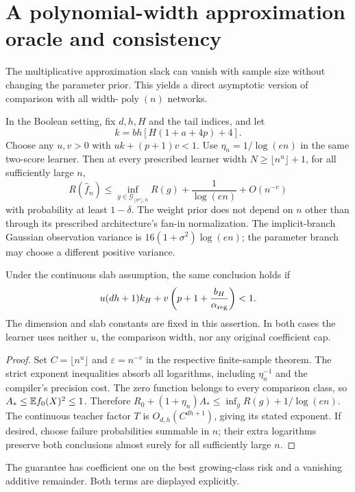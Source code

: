 \section{A polynomial-width approximation oracle and consistency}
\label{sec:growing-width}
The multiplicative approximation slack can vanish with sample size without changing the parameter prior. This yields a direct asymptotic version of comparison with all width-$\operatorname{poly}(n)$ networks.

\begin{corollary}
\label{cor:polynomial-growing-width}
In the Boolean setting, fix $d,h,H$ and the tail indices, and let
\[
 k=b h[H(1+a+4p)+4].
\]
Choose any $u,v>0$ with $uk+(p+1)v<1$. Use
$\eta_n=1/\log(en)$ in the same two-score learner. Then at every prescribed learner width $N\ge\lfloor n^u\rfloor+1$, for all sufficiently large $n$,
\[
 R(\widehat f_n)\le
 \inf_{g\in\mathcal G_{\lfloor n^u\rfloor,h}}R(g)
       +\frac1{\log(en)}+O(n^{-v})
\]
with probability at least $1-\delta$. The weight prior does not depend on $n$ other than through its prescribed architecture's fan-in normalization. The implicit-branch Gaussian observation variance is $16(1+\sigma^2)\log(en)$; the parameter branch may choose a different positive variance.

Under the continuous slab assumption, the same conclusion holds if
\[
 u(dh+1)k_H+v\left(p+1+\frac{b_H}{\alpha_{\rm reg}}\right)<1.
\]
The dimension and slab constants are fixed in this assertion. In both cases the learner uses neither $u$, the comparison width, nor any original coefficient cap.
\end{corollary}
\begin{proof}
Set $C=\lfloor n^u\rfloor$ and $\varepsilon=n^{-v}$ in the respective finite-sample theorem. The strict exponent inequalities absorb all logarithms, including $\eta_n^{-1}$ and the compiler's precision cost. The zero function belongs to every comparison class, so $A_*\le\mathbb E f_0(X)^2\le1$. Therefore
$R_0+(1+\eta_n)A_*\le\inf_gR(g)+1/\log(en)$.
The continuous teacher factor $T$ is $O_{d,h}(C^{dh+1})$, giving its stated exponent. If desired, choose failure probabilities summable in $n$; their extra logarithms preserve both conclusions almost surely for all sufficiently large $n$.
\end{proof}

The guarantee has coefficient one on the best growing-class risk and a vanishing additive remainder. Both terms are displayed explicitly.

